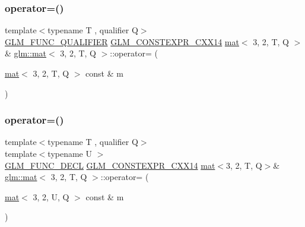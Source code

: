 \subsubsection{\texorpdfstring{operator=()}{operator=()}\hspace{0.1cm}{\footnotesize\ttfamily [1/3]}}
{\footnotesize\ttfamily template$<$typename T , qualifier Q$>$ \\
\mbox{\hyperlink{setup_8hpp_a33fdea6f91c5f834105f7415e2a64407}{G\+L\+M\+\_\+\+F\+U\+N\+C\+\_\+\+Q\+U\+A\+L\+I\+F\+I\+ER}} \mbox{\hyperlink{setup_8hpp_a4dd12abf5e1164bc57f3a34671d03844}{G\+L\+M\+\_\+\+C\+O\+N\+S\+T\+E\+X\+P\+R\+\_\+\+C\+X\+X14}} \mbox{\hyperlink{structglm_1_1mat}{mat}}$<$ 3, 2, T, Q $>$ \& \mbox{\hyperlink{structglm_1_1mat}{glm\+::mat}}$<$ 3, 2, T, Q $>$\+::operator= (\begin{DoxyParamCaption}\item[{\mbox{\hyperlink{structglm_1_1mat}{mat}}$<$ 3, 2, T, Q $>$ const \&}]{m }\end{DoxyParamCaption})}

\mbox{\label{structglm_1_1mat_3_013_00_012_00_01_t_00_01_q_01_4_a3d6d60a4cc35f5c3c0e3b546450cf4b5}} 
\subsubsection{\texorpdfstring{operator=()}{operator=()}\hspace{0.1cm}{\footnotesize\ttfamily [2/3]}}
{\footnotesize\ttfamily template$<$typename T , qualifier Q$>$ \\
template$<$typename U $>$ \\
\mbox{\hyperlink{setup_8hpp_ab2d052de21a70539923e9bcbf6e83a51}{G\+L\+M\+\_\+\+F\+U\+N\+C\+\_\+\+D\+E\+CL}} \mbox{\hyperlink{setup_8hpp_a4dd12abf5e1164bc57f3a34671d03844}{G\+L\+M\+\_\+\+C\+O\+N\+S\+T\+E\+X\+P\+R\+\_\+\+C\+X\+X14}} \mbox{\hyperlink{structglm_1_1mat}{mat}}$<$3, 2, T, Q$>$\& \mbox{\hyperlink{structglm_1_1mat}{glm\+::mat}}$<$ 3, 2, T, Q $>$\+::operator= (\begin{DoxyParamCaption}\item[{\mbox{\hyperlink{structglm_1_1mat}{mat}}$<$ 3, 2, U, Q $>$ const \&}]{m }\end{DoxyParamCaption})}

